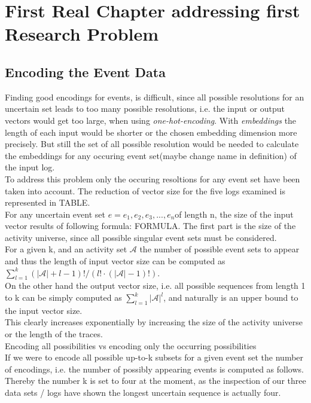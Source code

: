 \documentclass[
	a4paper,
	pagesize,
	pdftex,
	12pt,
	ngerman,
	fleqn,
	final,
	]{scrartcl}
\theoremstyle{plain}
\theoremstyle{definition}
\begin{document}
\section{First Real Chapter addressing first Research Problem}

	\subsection{Encoding the Event Data}
	Finding good encodings for events, is difficult, since all possible resolutions for an uncertain set leads to too many possible resolutions, i.e. the input or output vectors would get too large, when using \textit{one-hot-encoding}. With \textit{embeddings} the length of each input would be shorter or the chosen embedding dimension more precisely. But still the set of all possible resolution would be needed to calculate the embeddings for any occuring event set(maybe change name in definition) of the input log. \\
	To address this problem only the occuring resoltions for any event set have been taken into account. The reduction of vector size for the five logs examined is represented in TABLE. \\
	For any uncertain event set \(e = {e_1, e_2, e_3, ..., e_n}\)of length n, the size of the input vector results of following formula: FORMULA. The first part is the size of the activity universe, since all possible singular event sets must be considered. \\
	For a given k, and an activity set $\mathcal{A}$ the number of possible event sets to appear and thus the length of input vector size can be computed as $\sum_{l=1}^k (|\mathcal{A}| + l -1)! / (l! \cdot (|\mathcal{A}| - 1)!)$.  \\
	On the other hand the output vector size, i.e. all possible sequences from length 1 to k can be simply computed as $\sum_{l=1}^k |\mathcal{A}|^l$, and naturally is an upper bound to the input vector size. \\
	This clearly increases exponentially by increasing the size of the activity universe or the length of the traces.  \\ 
	Encoding all possibilities vs encoding only the occurring possibilities \\
	If we were to encode all possible up-to-k subsets for a given event set the number of encodings, i.e. the number of possibly appearing events is computed as follows. Thereby the number k is set to four at the moment, as the inspection of our three data sets / logs have shown the longest uncertain sequence is actually four.\\
\end{document}
